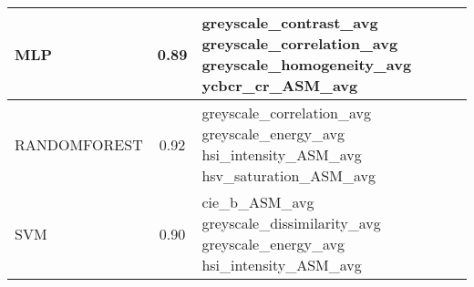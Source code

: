 \begin{longtable}{lcl}
\midrule
MLP & 0.89 & \begin{minipage}[t]{0.5\textwidth} greyscale\_contrast\_avg greyscale\_correlation\_avg greyscale\_homogeneity\_avg ycbcr\_cr\_ASM\_avg \end{minipage}\\
\midrule
RANDOMFOREST & 0.92 & \begin{minipage}[t]{0.5\textwidth} greyscale\_correlation\_avg greyscale\_energy\_avg hsi\_intensity\_ASM\_avg hsv\_saturation\_ASM\_avg \end{minipage}\\
\midrule
SVM & 0.90 & \begin{minipage}[t]{0.5\textwidth} cie\_b\_ASM\_avg greyscale\_dissimilarity\_avg greyscale\_energy\_avg hsi\_intensity\_ASM\_avg \end{minipage}\\
\end{longtable}
